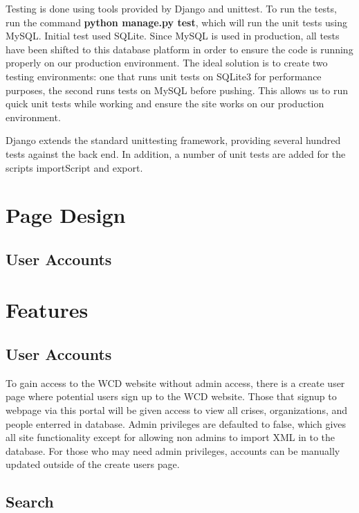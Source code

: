 \documentclass[12pt]{report}
\begin{document}
Testing is done using tools provided by Django and unittest.
To run the tests, run the command \textbf{python manage.py test}, which will run the unit tests using MySQL.
Initial test used SQLite. Since MySQL is used in production, all tests have been shifted to this database platform in order to ensure the code 
is running properly on our production environment.
The ideal solution is to create two testing environments: one that runs unit tests on SQLite3 for performance purposes,
the second runs tests on MySQL before pushing.
This allows us to run quick unit tests while working and ensure the site works on our production environment.


Django extends the standard unittesting framework, providing several hundred tests against the back end.
In addition, a number of unit tests are added for the scripts importScript and export.


\newpage
\section*{Page Design}
\hfill



\subsection*{User Accounts}
\hfill


\newpage
\section*{Features}
\hfill


\subsection*{User Accounts}
\hfill

To gain access to the WCD website without admin access, there is a create user page where potential users sign up to the WCD website. Those that signup to webpage via this portal will be given access to view all crises, organizations, and people enterred in database. Admin privileges are defaulted to false, which gives all site functionality except for allowing non admins to import XML in to the database. For those who may need admin privileges, accounts can be manually updated outside of the create users page. 

\subsection*{Search}
\hfill
\end{document}
